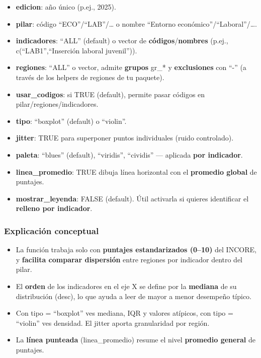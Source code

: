 \documentclass[
  11pt,
  letterpaper,
  DIV=11,
  numbers=noendperiod]{scrartcl}
\begin{document}
\begin{itemize}
\item
  \textbf{edicion}: año único (p.ej., 2025).
\item
  \textbf{pilar}: código ``ECO''/``LAB''/\ldots{} o nombre ``Entorno
  económico''/``Laboral''/\ldots.
\item
  \textbf{indicadores}: ``ALL'' (default) o vector de
  \textbf{códigos}/\textbf{nombres} (p.ej., c(``LAB1'',``Inserción
  laboral juvenil'')).
\item
  \textbf{regiones}: ``ALL'' o vector, admite \textbf{grupos} gr\_* y
  \textbf{exclusiones} con ``-'' (a través de los helpers de regiones de
  tu paquete).
\item
  \textbf{usar\_codigos}: si TRUE (default), permite pasar códigos en
  pilar/regiones/indicadores.
\item
  \textbf{tipo}: ``boxplot'' (default) o ``violin''.
\item
  \textbf{jitter}: TRUE para superponer puntos individuales (ruido
  controlado).
\item
  \textbf{paleta}: ``blues'' (default), ``viridis'', ``cividis'' ---
  aplicada \textbf{por indicador}.
\item
  \textbf{linea\_promedio}: TRUE dibuja línea horizontal con el
  \textbf{promedio global} de puntajes.
\item
  \textbf{mostrar\_leyenda}: FALSE (default). Útil activarla si quieres
  identificar el \textbf{relleno por indicador}.
\end{itemize}

\subsubsection{\texorpdfstring{\textbf{Explicación
conceptual}}{Explicación conceptual}}\label{explicaciuxf3n-conceptual-15}

\begin{itemize}
\item
  La función trabaja solo con \textbf{puntajes estandarizados (0--10)}
  del INCORE, y \textbf{facilita comparar dispersión} entre regiones por
  indicador dentro del pilar.
\item
  El \textbf{orden} de los indicadores en el eje X se define por la
  \textbf{mediana} de su distribución (desc), lo que ayuda a leer de
  mayor a menor desempeño típico.
\item
  Con tipo = ``boxplot'' ves mediana, IQR y valores atípicos, con tipo =
  ``violin'' ves densidad. El jitter aporta granularidad por región.
\item
  La \textbf{línea punteada} (linea\_promedio) resume el nivel
  \textbf{promedio general} de puntajes.
\end{itemize}
\end{document}
